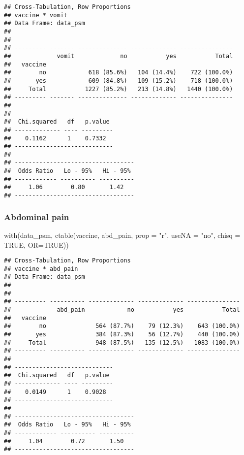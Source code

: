 \documentclass[
]{article}
\newenvironment{Shaded}{\begin{snugshade}}{\end{snugshade}}
\newcommand{\AttributeTok}[1]{\textcolor[rgb]{0.77,0.63,0.00}{#1}}
\newcommand{\ConstantTok}[1]{\textcolor[rgb]{0.00,0.00,0.00}{#1}}
\newcommand{\FunctionTok}[1]{\textcolor[rgb]{0.00,0.00,0.00}{#1}}
\newcommand{\NormalTok}[1]{#1}
\newcommand{\StringTok}[1]{\textcolor[rgb]{0.31,0.60,0.02}{#1}}
\begin{document}
\begin{verbatim}
## Cross-Tabulation, Row Proportions  
## vaccine * vomit  
## Data Frame: data_psm  
## 
## 
## --------- ------- -------------- ------------- ---------------
##             vomit             no           yes           Total
##   vaccine                                                     
##        no            618 (85.6%)   104 (14.4%)    722 (100.0%)
##       yes            609 (84.8%)   109 (15.2%)    718 (100.0%)
##     Total           1227 (85.2%)   213 (14.8%)   1440 (100.0%)
## --------- ------- -------------- ------------- ---------------
## 
## ----------------------------
##  Chi.squared   df   p.value 
## ------------- ---- ---------
##    0.1162      1    0.7332  
## ----------------------------
## 
## ----------------------------------
##  Odds Ratio   Lo - 95%   Hi - 95% 
## ------------ ---------- ----------
##     1.06        0.80       1.42   
## ----------------------------------
\end{verbatim}

\hypertarget{abdominal-pain-1}{%
\subsubsection{Abdominal pain}\label{abdominal-pain-1}}

\begin{Shaded}
\begin{Highlighting}[]
\FunctionTok{with}\NormalTok{(data\_psm, }\FunctionTok{ctable}\NormalTok{(vaccine, abd\_pain, }\AttributeTok{prop =} \StringTok{"r"}\NormalTok{, }\AttributeTok{useNA =} \StringTok{"no"}\NormalTok{, }\AttributeTok{chisq =} \ConstantTok{TRUE}\NormalTok{, }\AttributeTok{OR=}\ConstantTok{TRUE}\NormalTok{))}
\end{Highlighting}
\end{Shaded}

\begin{verbatim}
## Cross-Tabulation, Row Proportions  
## vaccine * abd_pain  
## Data Frame: data_psm  
## 
## 
## --------- ---------- ------------- ------------- ---------------
##             abd_pain            no           yes           Total
##   vaccine                                                       
##        no              564 (87.7%)    79 (12.3%)    643 (100.0%)
##       yes              384 (87.3%)    56 (12.7%)    440 (100.0%)
##     Total              948 (87.5%)   135 (12.5%)   1083 (100.0%)
## --------- ---------- ------------- ------------- ---------------
## 
## ----------------------------
##  Chi.squared   df   p.value 
## ------------- ---- ---------
##    0.0149      1    0.9028  
## ----------------------------
## 
## ----------------------------------
##  Odds Ratio   Lo - 95%   Hi - 95% 
## ------------ ---------- ----------
##     1.04        0.72       1.50   
## ----------------------------------
\end{verbatim}
\end{document}
